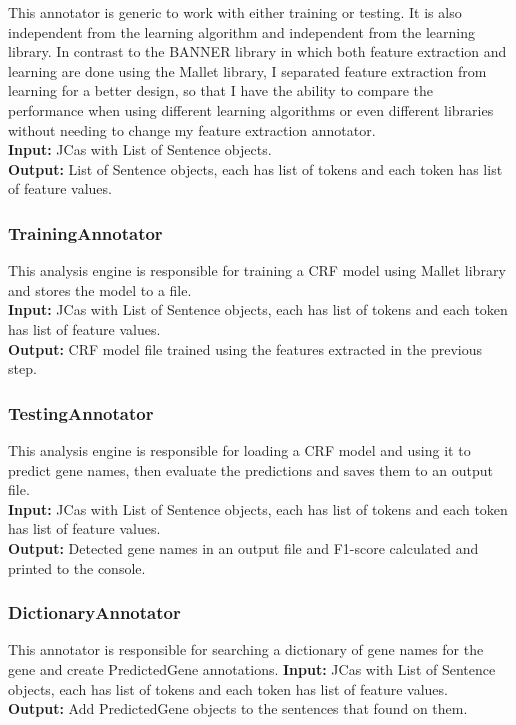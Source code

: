 \documentclass{article}
\begin{document}
This annotator is generic to work with either training or testing. It is also independent from the learning algorithm and independent from the learning library. In contrast to the BANNER library in which both feature extraction and learning are done using the Mallet library, I separated feature extraction from learning for a better design, so that I have the ability to compare the performance when using different learning algorithms or even different libraries without needing to change my feature extraction annotator.\\
\textbf{Input:} JCas with List of Sentence objects.\\
\textbf{Output:} List of Sentence objects, each has list of tokens and each token has list of feature values.\\


\subsubsection{TrainingAnnotator}

This analysis engine is responsible for training a CRF model using Mallet library and stores the model to a file.\\
\textbf{Input:} JCas with List of Sentence objects, each has list of tokens and each token has list of feature values.\\
\textbf{Output:} CRF model file trained using the features extracted in the previous step.\\

\subsubsection{TestingAnnotator}
 This analysis engine is responsible for loading a CRF model and using it to predict gene names, then evaluate the predictions and saves them to an output file.\\
\textbf{Input:} JCas with List of Sentence objects, each has list of tokens and each token has list of feature values.\\
\textbf{Output:} Detected gene names in an output file and F1-score calculated and printed to the console.\\

\subsubsection{DictionaryAnnotator}
This annotator is responsible for searching a dictionary of gene names for the gene and create PredictedGene annotations.
\textbf{Input:} JCas with List of Sentence objects, each has list of tokens and each token has list of feature values.\\
\textbf{Output:} Add PredictedGene objects to the sentences that found on them.\\
\end{document}
